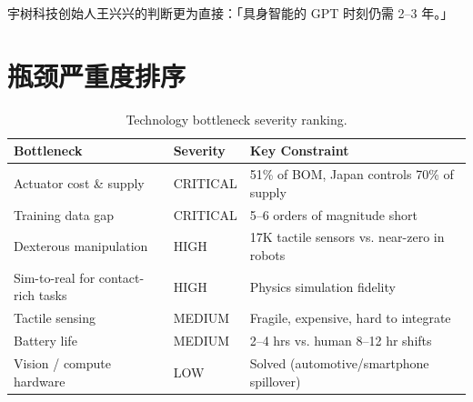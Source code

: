 宇树科技创始人王兴兴的判断更为直接\cite{unitree2025gptmoment}：「具身智能的 GPT 时刻仍需 2--3 年。」

\section{瓶颈严重度排序}

\begin{table}[htbp]
\centering
\caption{Technology bottleneck severity ranking.}
\label{tab:bottlenecks}
\begin{tabularx}{\textwidth}{llX}
\toprule
\rowcolor{figLightGray}
\textbf{Bottleneck} & \textbf{Severity} & \textbf{Key Constraint} \\
\midrule
Actuator cost \& supply & CRITICAL & 51\% of BOM, Japan controls 70\% of supply \\
Training data gap & CRITICAL & 5--6 orders of magnitude short \\
Dexterous manipulation & HIGH & 17K tactile sensors vs. near-zero in robots \\
Sim-to-real for contact-rich tasks & HIGH & Physics simulation fidelity \\
Tactile sensing & MEDIUM & Fragile, expensive, hard to integrate \\
Battery life & MEDIUM & 2--4 hrs vs. human 8--12 hr shifts \\
Vision / compute hardware & LOW & Solved (automotive/smartphone spillover) \\
\bottomrule
\end{tabularx}
\end{table}

